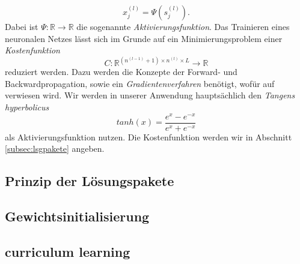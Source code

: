 \[
    x_j^{(l)}=\Psi(s_j^{(l)}).
\]
Dabei ist $\Psi: \mathbb{R} \rightarrow \mathbb{R}$ die sogenannte \textit{Aktivierungsfunktion}. Das Trainieren eines
neuronalen Netzes lässt sich im Grunde auf ein Minimierungsproblem einer \textit{Kostenfunktion}
\[
    C: \mathbb{R}^{\left(n^{(l-1)} + 1\right) \times n^{(l)} \times L} \rightarrow \mathbb{R}
\]
reduziert werden. Dazu werden die Konzepte der Forward- und Backwardpropagation, sowie ein \textit{Gradientenverfahren}
benötigt, wofür auf \cite[6.2.6]{ovidiucalinDeepLearningArchitectures} verwiesen wird. Wir werden in unserer Anwendung
hauptsächlich den \textit{Tangens hyperbolicus}
\[
    tanh(x)=\frac{e^x - e^{-x}}{e^x + e^{-x}}
\]
als Aktivierungsfunktion nutzen. Die Kostenfunktion werden wir in Abschnitt \eqref{subsec:lsgpakete} angeben.

\subsection{Prinzip der Lösungspakete}
\label{subsec:lsgpakete}

\subsection{Gewichtsinitialisierung}
\label{subsec:gewichtsinitialisierung}




\subsection{curriculum learning}
\label{subsec:curriculum-learning}
